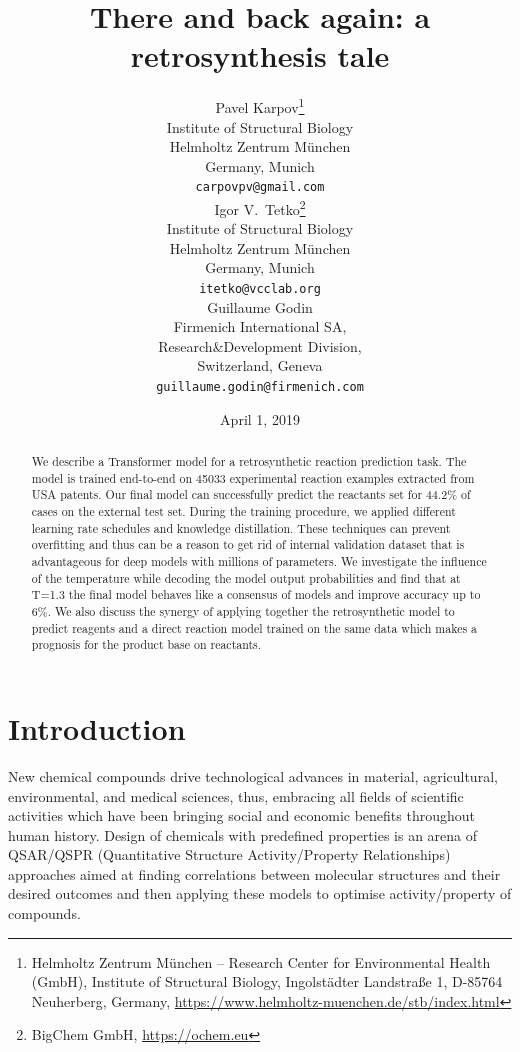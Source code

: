 \documentclass{article}
\title{There and back again: a retrosynthesis tale}
\date{April 1, 2019}
\author{
  Pavel Karpov\thanks{Helmholtz Zentrum M{\"u}nchen -- Research Center for Environmental Health (GmbH), Institute of Structural Biology, Ingolst{\"a}dter Landstra{\ss}e 1, D-85764 Neuherberg, Germany, \url{https://www.helmholtz-muenchen.de/stb/index.html}}\\
  Institute of Structural Biology\\
  Helmholtz Zentrum M{\"u}nchen\\
  Germany, Munich \\
  \texttt{carpovpv@gmail.com} \\
  \And
  Igor V.~Tetko\thanks{BigChem GmbH, \url{https://ochem.eu}} \\
  Institute of Structural Biology\\
  Helmholtz Zentrum M{\"u}nchen\\
  Germany, Munich \\ 
  \texttt{itetko@vcclab.org} \\
  \And 
  Guillaume Godin\\
  Firmenich International SA,\\
  Research\&Development Division, \\
  Switzerland, Geneva \\
  \texttt{guillaume.godin@firmenich.com}
}
\begin{document}
\maketitle

\begin{abstract}
We describe a Transformer model for a retrosynthetic reaction prediction task. 
The model is trained end-to-end on 45033 experimental reaction examples extracted 
from USA patents. Our final model can successfully predict the reactants set for 
44.2\% of cases on the external test set. During the training procedure, we applied 
different learning rate schedules and knowledge distillation. These techniques can prevent 
overfitting and thus can be a reason to get rid of internal validation dataset that 
is advantageous for deep models with millions of parameters. We investigate 
the influence of the temperature while decoding the model output probabilities and find 
that at T=1.3 the final model behaves like a consensus of models and improve accuracy up to 6\%. 
We also discuss the synergy of applying together the retrosynthetic model to predict 
reagents and a direct reaction model trained on the same data which makes a prognosis 
for the product base on reactants.
\end{abstract}


\section{Introduction}
New chemical compounds drive technological advances in material, agricultural, environmental, and medical sciences, thus, embracing all fields of scientific activities which have been bringing social and economic benefits throughout human history. Design of chemicals with predefined properties is an arena of QSAR/QSPR (Quantitative Structure Activity/Property Relationships) approaches aimed at finding correlations between molecular structures and their desired outcomes and then applying these models to optimise activity/property of compounds. 
\end{document}
